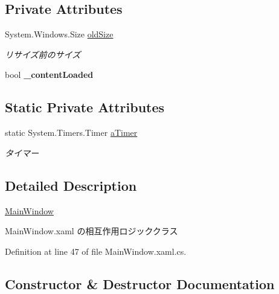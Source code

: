 \subsection*{Private Attributes}
\begin{DoxyCompactItemize}
\item 
\mbox{\label{class_reversi4color_wpf_1_1_main_window_a1857642b52ef8d10a778fe1beccab002}} 
System.\+Windows.\+Size \hyperlink{class_reversi4color_wpf_1_1_main_window_a1857642b52ef8d10a778fe1beccab002}{old\+Size}
\begin{DoxyCompactList}\small\item\em リサイズ前のサイズ \end{DoxyCompactList}\item 
\mbox{\label{class_reversi4color_wpf_1_1_main_window_a03146ff24268f3a190fb5f8cea708ac0}} 
bool {\bfseries \+\_\+content\+Loaded}
\end{DoxyCompactItemize}
\subsection*{Static Private Attributes}
\begin{DoxyCompactItemize}
\item 
\mbox{\label{class_reversi4color_wpf_1_1_main_window_af59cb1c3ab5bad6256e2e3eeadba0c35}} 
static System.\+Timers.\+Timer \hyperlink{class_reversi4color_wpf_1_1_main_window_af59cb1c3ab5bad6256e2e3eeadba0c35}{a\+Timer}
\begin{DoxyCompactList}\small\item\em タイマー \end{DoxyCompactList}\end{DoxyCompactItemize}


\subsection{Detailed Description}
\hyperlink{class_reversi4color_wpf_1_1_main_window}{Main\+Window} 

Main\+Window.\+xaml の相互作用ロジッククラス

Definition at line 47 of file Main\+Window.\+xaml.\+cs.



\subsection{Constructor \& Destructor Documentation}
\mbox{\label{class_reversi4color_wpf_1_1_main_window_ad472ea40f8c1574627f7d855cd6515f1}} 
